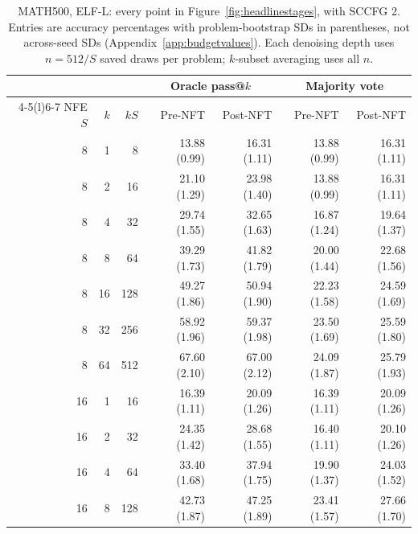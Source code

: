 \begin{table}[p]
\caption{MATH500, ELF-L: every point in Figure~\ref{fig:headlinestages}, with SCCFG 2. Entries are accuracy percentages with problem-bootstrap SDs in parentheses, not across-seed SDs (Appendix~\ref{app:budgetvalues}). Each denoising depth uses $n=512/S$ saved draws per problem; $k$-subset averaging uses all $n$.}
\label{tab:budgetvaluesmathl}
\centering\small
\setlength{\tabcolsep}{5pt}
\begin{tabular}{@{}rrr rrrr@{}}
\toprule
& & & \multicolumn{2}{c}{Oracle pass@$k$} & \multicolumn{2}{c}{Majority vote} \\
\cmidrule(lr){4-5}\cmidrule(l){6-7}
NFE $S$ & $k$ & $kS$ & Pre-NFT & Post-NFT & Pre-NFT & Post-NFT \\
\midrule
8 & 1 & 8 & 13.88 {\scriptsize (0.99)} & 16.31 {\scriptsize (1.11)} & 13.88 {\scriptsize (0.99)} & 16.31 {\scriptsize (1.11)} \\
8 & 2 & 16 & 21.10 {\scriptsize (1.29)} & 23.98 {\scriptsize (1.40)} & 13.88 {\scriptsize (0.99)} & 16.31 {\scriptsize (1.11)} \\
8 & 4 & 32 & 29.74 {\scriptsize (1.55)} & 32.65 {\scriptsize (1.63)} & 16.87 {\scriptsize (1.24)} & 19.64 {\scriptsize (1.37)} \\
8 & 8 & 64 & 39.29 {\scriptsize (1.73)} & 41.82 {\scriptsize (1.79)} & 20.00 {\scriptsize (1.44)} & 22.68 {\scriptsize (1.56)} \\
8 & 16 & 128 & 49.27 {\scriptsize (1.86)} & 50.94 {\scriptsize (1.90)} & 22.23 {\scriptsize (1.58)} & 24.59 {\scriptsize (1.69)} \\
8 & 32 & 256 & 58.92 {\scriptsize (1.96)} & 59.37 {\scriptsize (1.98)} & 23.50 {\scriptsize (1.69)} & 25.59 {\scriptsize (1.80)} \\
8 & 64 & 512 & 67.60 {\scriptsize (2.10)} & 67.00 {\scriptsize (2.12)} & 24.09 {\scriptsize (1.87)} & 25.79 {\scriptsize (1.93)} \\
\midrule
16 & 1 & 16 & 16.39 {\scriptsize (1.11)} & 20.09 {\scriptsize (1.26)} & 16.39 {\scriptsize (1.11)} & 20.09 {\scriptsize (1.26)} \\
16 & 2 & 32 & 24.35 {\scriptsize (1.42)} & 28.68 {\scriptsize (1.55)} & 16.40 {\scriptsize (1.11)} & 20.10 {\scriptsize (1.26)} \\
16 & 4 & 64 & 33.40 {\scriptsize (1.68)} & 37.94 {\scriptsize (1.75)} & 19.90 {\scriptsize (1.37)} & 24.03 {\scriptsize (1.52)} \\
16 & 8 & 128 & 42.73 {\scriptsize (1.87)} & 47.25 {\scriptsize (1.89)} & 23.41 {\scriptsize (1.57)} & 27.66 {\scriptsize (1.70)} \\

\end{tabular}
\end{table}

